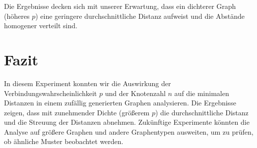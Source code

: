 Die Ergebnisse decken sich mit unserer Erwartung, dass ein dichterer Graph (höheres $p$) eine geringere durchschnittliche Distanz aufweist und die Abstände homogener verteilt sind.

\section{Fazit}
In diesem Experiment konnten wir die Auswirkung der Verbindungswahrscheinlichkeit $p$ und der Knotenzahl $n$ auf die minimalen Distanzen in einem zufällig generierten Graphen analysieren. Die Ergebnisse zeigen, dass mit zunehmender Dichte (größerem $p$) die durchschnittliche Distanz und die Streuung der Distanzen abnehmen. Zukünftige Experimente könnten die Analyse auf größere Graphen und andere Graphentypen ausweiten, um zu prüfen, ob ähnliche Muster beobachtet werden.

